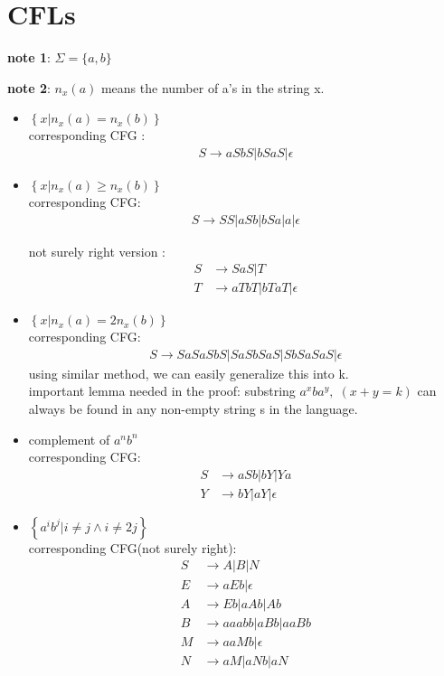 \documentclass{article}
\begin{document}
\section{CFLs}

    \textbf{note 1}: $\Sigma=\{a,b\}$

    \textbf{note 2}: $n_x(a)$ means the number of a's in the string x.


    \begin{itemize}
        \item  $\left\{x| n_x(a)=n_x(b)\right\}$ \\ corresponding CFG : 
            \begin{align*}
                S \rightarrow aSbS | bSaS | \epsilon
            \end{align*}
        \item $\left\{x | n_x(a)\geq n_x(b)\right\}$ \\corresponding CFG:
            \begin{align*}
                S \rightarrow SS | aSb | bSa | a | \epsilon
            \end{align*}

            not surely right version : 
            \begin{align*}
                S&\rightarrow SaS | T \\
                T&\rightarrow aTbT | bTaT | \epsilon
            \end{align*}
        \item $\left\{x | n_x(a)=2n_x(b)\right\}$  \\ corresponding CFG:
            \begin{align*}
                S \rightarrow SaSaSbS | SaSbSaS | SbSaSaS | \epsilon
            \end{align*}
            using similar method, we can easily generalize this into k.\\
            important lemma needed in the proof: substring $a^xba^y,\; (x+y=k)$ can always be found in any non-empty string s in the language.
        \item complement of $a^nb^n$ \\ corresponding CFG:
            \begin{align*}
                S & \rightarrow aSb | bY | Ya \\
                Y & \rightarrow bY | aY | \epsilon
            \end{align*}
        \item $\left\{ a^ib^j | i\neq j \wedge i \neq 2j\right\}$ \\ corresponding CFG(not surely right):
            \begin{align*}
                S & \rightarrow A | B | N\\
                E & \rightarrow aEb | \epsilon\\
                A & \rightarrow Eb | aAb | Ab\\
                B & \rightarrow aaabb | aBb | aaBb \\
                M & \rightarrow aaMb | \epsilon\\
                N & \rightarrow aM | aNb | aN
            \end{align*}


\end{itemize}
\end{document}
